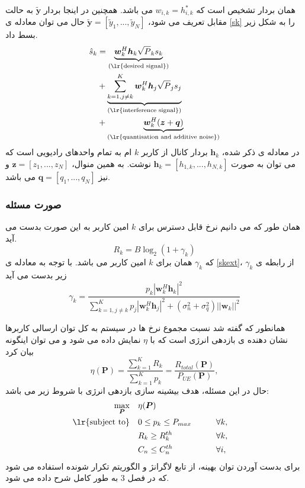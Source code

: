  همان بردار تشخیص است که $w_{i,k} = h_{i,k}^*$ می باشد.
همچنین در اینجا بردار $\tilde{\boldsymbol{y}}$ به حالت مقابل تعریف می شود، 
$\tilde{\boldsymbol{y}} = [ \tilde{y}_1,..., \tilde{y}_N]$
حال می توان معادله ی \eqref{sk} را به شکل زیر بسط داد.
\begin{equation}\label{skext}
\begin{split}
\hat{s}_k &= \underbrace{\boldsymbol{w}_k^H \boldsymbol{h}_k \sqrt{P}_k s_k }_{\text{(\lr{desired signal})}} \\
&+\underbrace{ \sum_{k=1,j \neq k}^{K}  \boldsymbol{w}_k^H \boldsymbol{h}_j \sqrt{P}_j s_j}_{\text{(\lr{interference signal})}}  \\
&+ \underbrace{\boldsymbol{w}_k^H (\boldsymbol{z}+\boldsymbol{q})}_{\text{(\lr{quantisation and additive noise})}}\\
\end{split}
\end{equation}
در معادله ی ذکر شده، $\boldsymbol{h}_k$ بردار کانال از کاربر $k$ ام به تمام واحدهای رادیویی است که می توان به صورت $\boldsymbol{h}_k = [h_{1,k},...,h_{N,k}]$ نوشت. به همین منوال،
 $\boldsymbol{z} = [z_{1},...,z_{N}]$
و نیز $
\boldsymbol{q} = [q_{1},...,q_{N}]$
می باشد.
\subsubsection{صورت مسئله}
همان طور که می دانیم نرخ قابل دسترس برای $k$ امین کاربر به این صورت بدست می آید.
\begin{equation}
R_k = B \log_2(1+ \gamma_k)
\end{equation}
که $ \gamma_k$ همان  برای $k$ امین کاربر می باشد. با توجه به معادله ی \eqref{skext}، $\gamma_k$ از رابطه ی زیر بدست می آید
\begin{equation}
\gamma_k = \frac{p_k |\boldsymbol{w}_k^H \boldsymbol{h}_k|^2}{\sum_{k=1,j \neq k}^{K} p_j |\boldsymbol{w}_k^H \boldsymbol{h}_j|^2 + (\sigma_n^2+\sigma_q^2) ||\boldsymbol{w}_k||^2}
\end{equation}


 همانطور که گفته شد نسبت مجموع نرخ ها در سیستم به کل توان ارسالی کاربرها نشان دهنده ی بازدهی انرژی است که با $\eta$ نمایش داده می شود و می توان اینگونه بیان کرد
\begin{equation}\label{eta1}
\eta(\boldsymbol{P}) = \frac{\sum\limits_{k=1}^{K}{R}_{k} }{ \sum\limits_{k=1}^{K}{p}_{k}}= \frac{R_{total}(\boldsymbol{P})}{P_{UE}(\boldsymbol{P})},
\end{equation}
حال در این مسئله، هدف بیشینه سازی بازدهی انرژی با شروط زیر می باشد:
 \begin{equation}\label{p11}
\begin{aligned}
\max\limits_{\boldsymbol{P}}   \quad &   \eta(\boldsymbol{P})\\
\text{\lr{subject to}} \quad  &  0 \leq {p}_{k} \leq P_{max} && \qquad \forall k,   \\
&{R}_{k} \geq {R}_{k}^{th} && \qquad \forall k, \\ 
&C_{n} \leq C_{n}^{th}  &&\qquad  \forall i, \\
\end{aligned}			
\end{equation}
برای بدست آوردن توان بهینه، از تابع لاگرانژ و الگوریتم تکرار شونده استفاده می شود که در فصل 3 به طور کامل شرح داده می شود.
